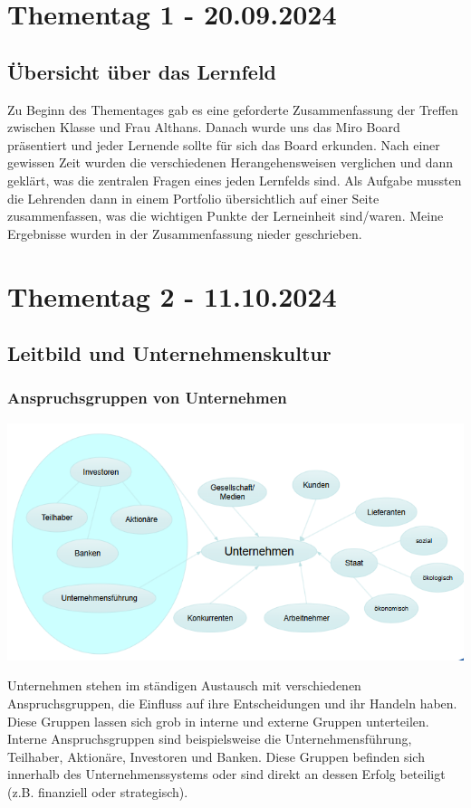 \documentclass[]{article}
\begin{document}
\section{Thementag 1 - 20.09.2024}

\subsection{Übersicht über das Lernfeld}

Zu Beginn des Thementages gab es eine geforderte Zusammenfassung der Treffen zwischen Klasse und Frau Althans. Danach wurde uns das Miro Board präsentiert und jeder Lernende sollte für sich das Board erkunden. Nach einer gewissen Zeit wurden die verschiedenen Herangehensweisen verglichen und dann geklärt, was die zentralen Fragen eines jeden Lernfelds sind. Als Aufgabe mussten die Lehrenden dann in einem Portfolio übersichtlich auf einer Seite zusammenfassen, was die wichtigen Punkte der Lerneinheit sind/waren. Meine Ergebnisse wurden in der Zusammenfassung nieder geschrieben.

\newpage
\section{Thementag 2 - 11.10.2024}
\subsection{Leitbild und Unternehmenskultur}
\subsubsection{Anspruchsgruppen von Unternehmen}
\includegraphics[width=\linewidth]{assetes/Anspruchsgruppen Unternehmen.png}

Unternehmen stehen im ständigen Austausch mit verschiedenen Anspruchsgruppen, die Einfluss auf ihre Entscheidungen und ihr Handeln haben. Diese Gruppen lassen sich grob in interne und externe Gruppen unterteilen. Interne Anspruchsgruppen sind beispielsweise die Unternehmensführung, Teilhaber, Aktionäre, Investoren und Banken. Diese Gruppen befinden sich innerhalb des Unternehmenssystems oder sind direkt an dessen Erfolg beteiligt (z.B. finanziell oder strategisch).
\end{document}
